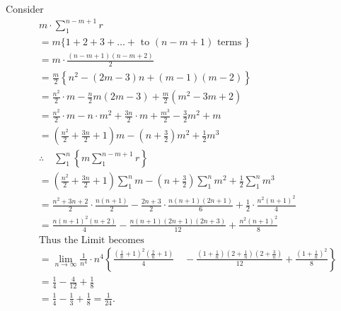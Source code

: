 \begin{enumerate}
Consider
$$
\begin{aligned}
& m \cdot \sum_1^{n-m+1} r \\
& =m\{1+2+3+\ldots+\text { to }(n-m+1) \text { terms }\} \\
& =m \cdot \frac{(n-m+1)(n-m+2)}{2} \\
& =\frac{m}{2}\left\{n^2-(2 m-3) n+(m-1)(m-2)\right\} \\
& =\frac{n^2}{2} \cdot m-\frac{n}{2} m(2 m-3)+\frac{m}{2}\left(m^2-3 m+2\right) \\
& =\frac{n^2}{2} \cdot m-n \cdot m^2+\frac{3 n}{2} \cdot m+\frac{m^3}{2}-\frac{3}{2} m^2+m \\
& =\left(\frac{n^2}{2}+\frac{3 n}{2}+1\right) m-\left(n+\frac{3}{2}\right) m^2+\frac{1}{2} m^3 \\
& \therefore \quad \sum_1^n\left\{m \sum_1^{n-m+1} r\right\} \\
& =\left(\frac{n^2}{2}+\frac{3 n}{2}+1\right) \sum_1^n m-\left(n+\frac{3}{2}\right) \sum_1^n m^2+\frac{1}{2} \sum_1^n m^3 \\
& =\frac{n^2+3 n+2}{2} \cdot \frac{n(n+1)}{2} -\frac{2 n+3}{2} \cdot \frac{n(n+1)(2 n+1)}{6}+\frac{1}{2} \cdot \frac{n^2(n+1)^2}{4} \\
& =\frac{n(n+1)^2(n+2)}{4}-\frac{n(n+1)(2 n+1)(2 n+3)}{12} +\frac{n^2(n+1)^2}{8} \\
& \text{Thus the Limit becomes}\\
& =\lim _{n \rightarrow \infty} \frac{1}{n^4} \cdot n^4\left\{\frac{\left(\frac{1}{n}+1\right)^2\left(\frac{2}{n}+1\right)}{4}\right. \left.\quad-\frac{\left(1+\frac{1}{n}\right)\left(2+\frac{1}{n}\right)\left(2+\frac{3}{n}\right)}{12}+\frac{\left(1+\frac{1}{n}\right)^2}{8}\right\} \\
& =\frac{1}{4}-\frac{4}{12}+\frac{1}{8} \\
& =\frac{1}{4}-\frac{1}{3}+\frac{1}{8}=\frac{1}{24} .
\end{aligned}
$$
\end{enumerate}


